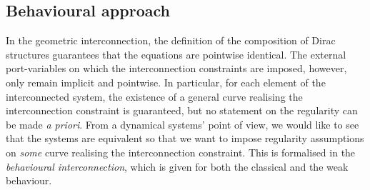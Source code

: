 \documentclass[preprint,12pt]{elsarticle}
\theoremstyle{definition}
\begin{document}
\subsection{Behavioural approach}\label{sec:behavioural_approach}

In the geometric interconnection, the definition of the composition of Dirac structures guarantees that the equations are pointwise identical. The external port-variables on which the interconnection constraints are imposed, however, only remain implicit and pointwise. In particular, for each element of the interconnected system, the existence of a general curve realising the interconnection constraint is guaranteed, but no statement on the regularity can be made \textit{a priori}. From a dynamical systems' point of view, we would like to see that the systems are equivalent so that we want to impose regularity assumptions on \textit{some} curve realising the interconnection constraint. This is formalised in the \textit{behavioural interconnection}, which is given for both the classical and the weak behaviour.
\end{document}
